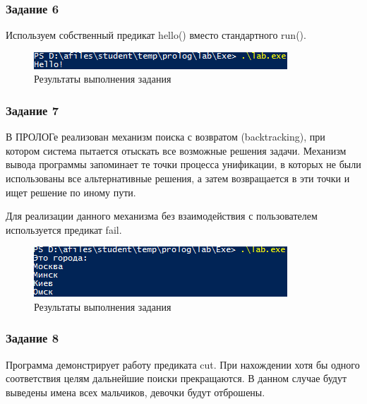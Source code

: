 \documentclass[14pt,a4paper,report]{report}
\begin{document}
\subsubsection{Задание 6}

Используем собственный предикат hello() вместо стандартного run().





\begin{figure}[h!]
	\centering
	\includegraphics[scale = 1.0]{images/d6.png}
	\caption{Результаты выполнения задания}
\end{figure}

\subsubsection{Задание 7}

В ПРОЛОГе реализован механизм поиска с возвратом (backtracking), при котором система пытается отыскать все возможные решения задачи. Механизм вывода программы запоминает те точки процесса унификации, в которых не были использованы все альтернативные решения, а затем возвращается в эти точки и ищет решение по иному пути.

Для реализации данного механизма без взаимодействия с пользователем используется предикат fail. 





\begin{figure}[h!]
	\centering
	\includegraphics[scale = 1.0]{images/d7.png}
	\caption{Результаты выполнения задания}
\end{figure}

\subsubsection{Задание 8}

Программа демонстрирует работу предиката cut. При нахождении хотя бы одного соответствия целям дальнейшие поиски прекращаются. В данном случае будут выведены имена всех мальчиков, девочки будут отброшены. 
\end{document}
